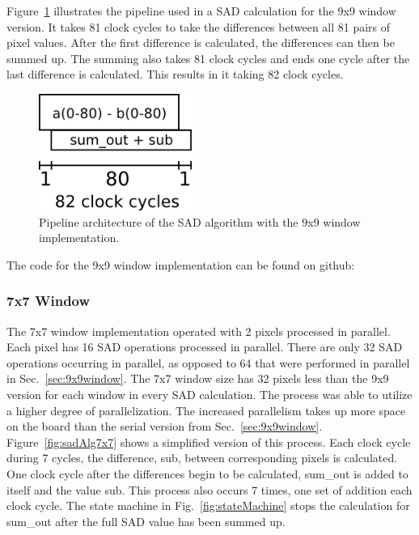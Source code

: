 Figure~\ref{fig:sadPipe9x9} illustrates the pipeline used in a SAD calculation for the 9x9 window version. It takes 81 clock cycles to take the differences between all 81 pairs of pixel values. After the first difference is calculated, the differences can then be summed up. The summing also takes 81 clock cycles and ends one cycle after the last difference is calculated. This results in it taking 82 clock cycles.

\begin{figure}[h]
	\begin{center}
		\includegraphics[width=50mm]{figures/sadPipeline9x9.png}
		\captionfonts
		\caption{Pipeline architecture of the SAD algorithm with the 9x9 window implementation.}
		\label{fig:sadPipe9x9}
	\end{center}
\end{figure}

The code for the 9x9 window implementation can be found on github:
\\

\subsubsection{7x7 Window}
\label{sec:7x7window}

The 7x7 window implementation operated with 2 pixels processed in parallel. Each pixel has 16 SAD operations processed in parallel. There are only 32 SAD operations occurring in parallel, as opposed to 64 that were performed in parallel in Sec.~\ref{sec:9x9window}. The 7x7 window size has 32 pixels less than the 9x9 version for each window in every SAD calculation. The process was able to utilize a higher degree of parallelization. The increased parallelism takes up more space on the board than the serial version from Sec.~\ref{sec:9x9window}. Figure~\ref{fig:sadAlg7x7} shows a simplified version of this process. Each clock cycle during 7 cycles, the difference, sub, between corresponding pixels is calculated. One clock cycle after the differences begin to be calculated, sum\_out is added to itself and the value sub. This process also occurs 7 times, one set of addition each clock cycle. The state machine in Fig.~\ref{fig:stateMachine} stops the calculation for sum\_out after the full SAD value has been summed up.

